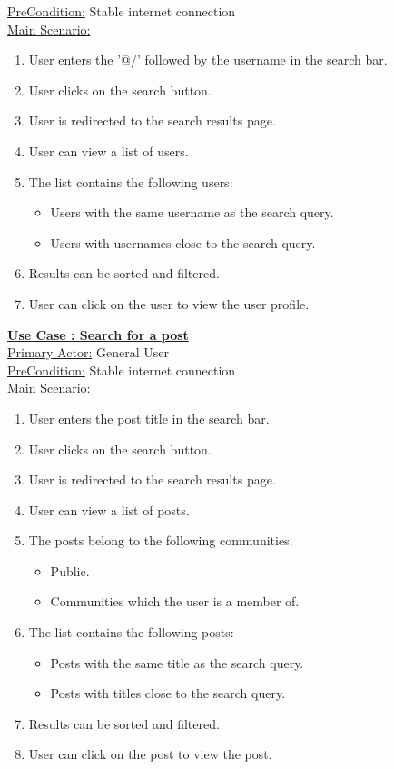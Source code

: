 \documentclass[conference,compsoc]{IEEEtran}
\newcounter{UC}
\newcommand{\nextU}{\stepcounter{UC}\theUC}
\begin{document}
\underline{PreCondition:} Stable internet connection\\

\underline{Main Scenario:}\\
\begin{enumerate}
    \item User enters the '@/' followed by the username in the search bar.
    \item User clicks on the search button.
    \item User is redirected to the search results page.
    \item User can view a list of users.
    \item The list contains the following users:
          \begin{itemize}
              \item Users with the same username as the search query.
              \item Users with usernames close to the search query.
          \end{itemize}
    \item Results can be sorted and filtered.
    \item User can click on the user to view the user profile.
\end{enumerate}

\underline{\textbf{Use Case \nextU: Search for a post}}\\

\underline{Primary Actor:} General User\\

\underline{PreCondition:} Stable internet connection\\

\underline{Main Scenario:}\\
\begin{enumerate}
    \item User enters the post title in the search bar.
    \item User clicks on the search button.
    \item User is redirected to the search results page.
    \item User can view a list of posts.
    \item The posts belong to the following communities.
          \begin{itemize}
              \item Public.
              \item Communities which the user is a member of.
          \end{itemize}
    \item The list contains the following posts:
          \begin{itemize}
              \item Posts with the same title as the search query.
              \item Posts with titles close to the search query.
          \end{itemize}
    \item Results can be sorted and filtered.
    \item User can click on the post to view the post.
\end{enumerate}
\end{document}
